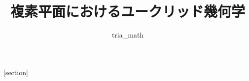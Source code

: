 \usepackage{amsmath}
\usepackage{amssymb}
\usepackage{amsfonts}
\usepackage{amsthm}
\usepackage{ascmac}
\usepackage{tcolorbox}
\usepackage{gauss}
%
\title{複素平面におけるユークリッド幾何学}
\author{tria\_math}
%
\DeclareMathOperator{\Arg}{Arg}
%
\theoremstyle{definition}
\newtheorem*{prf}{証明}
\newtheorem*{prff}{証明2}
\newtheorem*{sol*}{解答}
\newtheorem*{soll*}{別解}
\newtheorem{eg}{例}[section]
\newtheorem*{note}{注意}
%
[section]
\renewcommand{\thebthmcounter}{\thesection.\arabic{bthmcounter}}
\newenvironment{bdef}%
{\refstepcounter{bthmcounter}\begin{itembox}[l]{\textbf{定義\thebthmcounter.}}}%
{\end{itembox}}
\newenvironment{bthm}[1][]%
{\refstepcounter{bthmcounter}%
\def\bthmcaption{#1}%
\ifx\bthmcaption\empty\begin{itembox}[l]{\textbf{定理\thebthmcounter.}}%
\else\begin{itembox}[l]{\textbf{定理\thebthmcounter} (#1).}%
\fi}%
{\end{itembox}}
\newenvironment{bprop}%
{\refstepcounter{bthmcounter}\begin{itembox}[l]{\textbf{命題\thebthmcounter.}}}%
{\end{itembox}}
\newenvironment{bcor}%
{\refstepcounter{bthmcounter}\begin{itembox}[l]{\textbf{系\thebthmcounter.}}}%
{\end{itembox}}
\newenvironment{bset}%
{\begin{itembox}[l]{\textbf{設定}}}%
{\end{itembox}}
\newenvironment{bprb}[1][]%
{\refstepcounter{bthmcounter}%
\def\bthmcaption{#1}%
\ifx\bthmcaption\empty\begin{itembox}[l]{\textbf{問題\thebthmcounter.}}%
\else\begin{itembox}[l]{\textbf{問題\thebthmcounter} (#1).}%
\fi}%
{\end{itembox}}
\newif\ifshowsolutions
\NewEnviron{ifsol*}{\ifshowsolutions\begin{sol*}\BODY\end{sol*}\fi}
\NewEnviron{ifsoll*}{\ifshowsolutions\begin{soll*}\BODY\end{soll*}\fi}
\newenvironment{prf*}{\begin{prf}}{\qed\end{prf}}
\newenvironment{prff*}{\begin{prff}}{\qed\end{prff}}
%
\newcommand{\hintcolor}{white}
\newcommand{\hint}[2]{\par\textbf{問題\ref{#1}} {\color{\hintcolor} #2}}
\usepackage[dvipdfmx]{hyperref}
\usepackage{pxjahyper}
